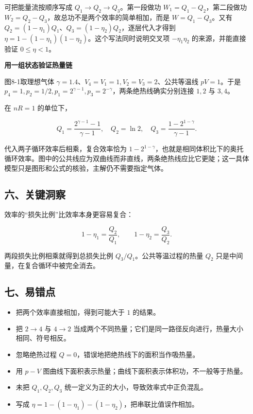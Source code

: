 \documentclass[12pt,a4paper,UTF8]{ctexart}
\newcommand{\tightlist}{\setlength{\itemsep}{0pt}\setlength{\parskip}{0pt}}
\begin{document}
可把能量流按顺序写成 \(Q_1\to Q_2\to Q_3\)。第一段做功
\(W_1=Q_1-Q_2\)，第二段做功
\(W_2=Q_2-Q_3\)，故总功不是两个效率的简单相加，而是 \(W=Q_1-Q_3\)。又有
\(Q_2=(1-\eta_1)Q_1\)、\(Q_3=(1-\eta_2)Q_2\)，逐层代入才得到
\(\eta=1-(1-\eta_1)(1-\eta_2)\)。这个写法同时说明交叉项
\(-\eta_1\eta_2\) 的来源，并能直接验证 \(0\le\eta<1\)。

\textbf{用一组状态验证热量链}

图8-1取理想气体 \(\gamma=1.4\)、\(V_4=V_1=1,V_2=V_3=2\)、公共等温线
\(pV=1\)。于是
\(p_4=1,p_2=1/2,p_1=2^{\gamma-1},p_3=2^{-\gamma}\)，两条绝热线确实分别连接
\(1,2\) 与 \(3,4\)。

在 \(nR=1\) 的单位下，

\[Q_1=\frac{2^{\gamma-1}-1}{\gamma-1},\quad
Q_2=\ln2,\quad
Q_3=\frac{1-2^{1-\gamma}}{\gamma-1}.\]

代入两子循环效率后相乘，复合效率恰为
\(1-2^{1-\gamma}\)，也就是相同体积比下的奥托循环效率。图中的公共线应为双曲线而非直线，两条绝热线应比它更陡；这一具体模型只是图形和公式的核验，主解仍不需要指定气体。

\subsection{六、关键洞察}\label{ux516dux5173ux952eux6d1eux5bdf-7}

效率的``损失比例''比效率本身更容易复合：

\[1-\eta_1=\frac{Q_2}{Q_1},
\qquad
1-\eta_2=\frac{Q_3}{Q_2}.\]

两段损失比例相乘就得到总损失比例 \(Q_3/Q_1\)。公共等温过程的热量 \(Q_2\)
只是中间量，在复合循环中被完全消去。

\subsection{七、易错点}\label{ux4e03ux6613ux9519ux70b9-7}

\begin{itemize}
\tightlist
\item
  把两个效率直接相加，得到可能大于 \(1\) 的结果。
\item
  把 \(2\to4\) 与 \(4\to2\)
  当成两个不同热量；它们是同一路径反向进行，热量大小相同、符号相反。
\item
  忽略绝热过程 \(Q=0\)，错误地把绝热线下的面积当作吸热量。
\item
  用 \(p-V\)
  图曲线下面积表示热量；曲线下面积表示体积功，不一般等于热量。
\item
  未把 \(Q_1,Q_2,Q_3\) 统一定义为正的大小，导致效率式中正负混乱。
\item
  写成 \(\eta=1-(1-\eta_1)-(1-\eta_2)\)，把串联比值误作相加。
\end{itemize}
\end{document}
